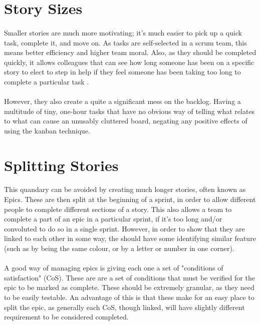 \documentclass{scrartcl}
\begin{document}
\section{Story Sizes}
\paragraph{}
Smaller stories are much more motivating; it's much easier to pick up a quick task, complete it, and move on. As tasks are self-selected in a scrum team, this means better efficiency and higher team moral. Also, as they should be completed quickly, it allows colleagues that can see how long someone has been on a specific story to elect to step in help if they feel someone has been taking too long to complete a particular task\cite{Collab}  . %
\paragraph{}
However, they also create a quite a significant mess on the backlog. Having a multitude of tiny, one-hour tasks that have no obvious way of telling what relates to what can cause an unusably cluttered board, negating any positive effects of using the kanban technique.

\section{Splitting Stories}
\paragraph{}
This quandary can be avoided by creating much longer stories, often known as Epics. These are then split at the beginning of a sprint\cite{Keith}, in order to allow different people to complete different sections of a story. This also allows a team to complete a part of an epic in a particular sprint, if it's too long and/or convoluted to do so in a single sprint. However, in order to show that they are linked to each other in some way, the should have some identifying similar feature (such as by being the same colour, or by a letter or number in one corner).
\paragraph{}
A good way of managing epics is giving each one a set of "conditions of satisfaction" (CoS). These are are a set of conditions that must be verified for the epic to be marked as complete. These should be extremely granular\cite{Artif}, as they need to be easily testable. An advantage of this is that these make for an easy place to split the epic, as generally each CoS, though linked, will have slightly different requirement to be considered completed.
\end{document}
